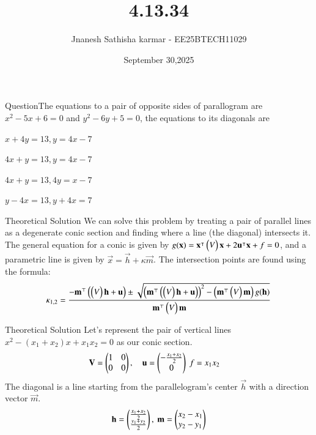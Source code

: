 \documentclass{beamer}
\title %
{4.13.34}
\date{September 30,2025}
\author 
{Jnanesh Sathisha karmar - EE25BTECH11029}
\begin{document}
\frame{\titlepage}
\begin{frame}{Question}The equations to a pair of opposite sides of parallogram are $x^2 - 5x + 6 = 0$ and $y^2 - 6y + 5 = 0$, the equations to its diagonals are
\begin{enumerate}
\begin{multicols}{2}
    \item $x+4y=13,y=4x-7$
    \item $4x+y=13,y=4x-7$
    \item $4x+y=13,4y=x-7$
    \item $y-4x=13,y+4x=7$
\end{multicols}
\end{enumerate}


\end{frame}

\begin{frame}{Theoretical Solution}
We can solve this problem by treating a pair of parallel lines as a degenerate conic section and finding where a line (the diagonal) intersects it. The general equation for a conic is given by $g(\mathbf{x}) = \mathbf{x}^\intercal \begin{pmatrix}V\end{pmatrix} \mathbf{x} + 2\mathbf{u}^\intercal \mathbf{x} + f = 0$, and a parametric line is given by $\vec{x} = \vec{h} + \kappa\vec{m}$. The intersection points are found using the formula:
\noindent
\begin{align}
\kappa_{1,2} = \frac{-\mathbf{m}^{\top} \left(\begin{pmatrix}V\end{pmatrix}\mathbf{h} + \mathbf{u}\right) \pm \sqrt{\left(\mathbf{m}^{\top} \left(\begin{pmatrix}V\end{pmatrix}\mathbf{h} + \mathbf{u}\right)\right)^2 - \left(\mathbf{m}^{\top} \begin{pmatrix}V\end{pmatrix} \mathbf{m}\right) g(\mathbf{h})}}{\mathbf{m}^{\top} \begin{pmatrix}V\end{pmatrix} \mathbf{m}}
\end{align}

\end{frame}
\begin{frame}{Theoretical Solution}
Let's represent the pair of vertical lines $x^2 - (x_1+x_2)x + x_1x_2 = 0$ as our conic section.
\begin{align}
    \vec{V} &= \myvec{1&0\\0&0}, \quad 
    \vec{u} = \myvec{-\frac{x_1+x_2}{2}\\0}\ 
    f = x_1x_2
\end{align}
The diagonal is a line starting from the parallelogram's center $\vec{h}$ with a direction vector $\vec{m}$.
\begin{align}
    \vec{h} = \myvec{\frac{x_1+x_2}{2} \\ \frac{y_1+y_2}{2} },\ 
    \vec{m} = \myvec{ x_2-x_1 \\ y_2-y_1 }
\end{align}
\end{frame}
\end{document}
